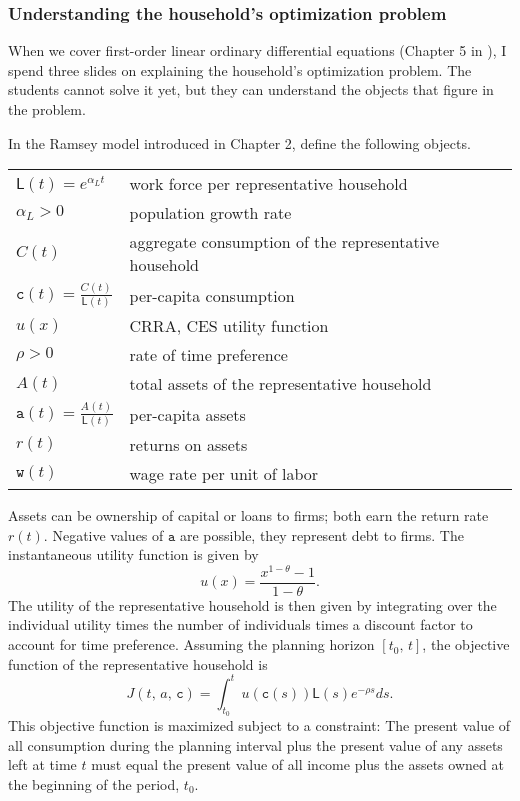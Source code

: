\documentclass[graybox]{svmult}
\begin{document}
\subsubsection{Understanding the household's optimization problem}

When we cover first-order linear ordinary differential equations (Chapter 5 in \cite{Sydsaeter2008}), I spend three slides on explaining the household's optimization problem. The students cannot solve it yet, but they can understand the objects that figure in the problem.

In the Ramsey model introduced in Chapter 2, define the following objects.
\smallskip

\begin{tabular}{ll}
$\mathsf{L}(t) = e^{\alpha_L t}$ & work force per representative household\\
$\alpha_L>0$ & population growth rate \\
$C(t)$ & aggregate consumption of the representative household\\
$\texttt{c}(t)=\frac{C(t)}{\mathsf{L}(t)}$ & per-capita consumption\\
$u(x)$ & CRRA, CES utility function  \\
$\rho>0$ & rate of time preference \\
$A(t)$ & total assets of the representative household\\
$\texttt{a}(t) = \frac{A(t)}{\mathsf{L}(t)}$ & per-capita assets \\
$r(t)$ & returns on assets \\
$\texttt{w}(t)$ & wage rate per unit of labor
\end{tabular}

Assets can be ownership of capital or loans to firms; both earn the return rate $r(t)$.  Negative values of $\texttt{a}$ are possible, they represent debt to firms. The instantaneous utility function is given by
\[
u(x) = \frac{x^{1-\theta}-1}{1-\theta}.
\]
The utility of the representative household is then given by integrating over the individual utility times the number of individuals times a discount factor to account for time preference.  Assuming the planning horizon $[t_0,\, t]$, the objective function of the representative household is
\[
J(t,\, a,\, \texttt{c}) = \int_{t_0}^t u(\texttt{c}(s)) \mathsf{L}(s) e^{-\rho s} ds.
\]
This objective function is maximized subject to a constraint:  The present value of all consumption during the planning interval plus the present value of any assets left at time $t$ must equal the present value of all income plus the assets owned at the beginning of the period, $t_0$.
\end{document}
